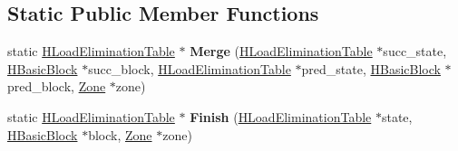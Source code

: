 \subsection*{Static Public Member Functions}
\begin{DoxyCompactItemize}
\item 
static \hyperlink{classv8_1_1internal_1_1_h_load_elimination_table}{H\+Load\+Elimination\+Table} $\ast$ {\bfseries Merge} (\hyperlink{classv8_1_1internal_1_1_h_load_elimination_table}{H\+Load\+Elimination\+Table} $\ast$succ\+\_\+state, \hyperlink{classv8_1_1internal_1_1_h_basic_block}{H\+Basic\+Block} $\ast$succ\+\_\+block, \hyperlink{classv8_1_1internal_1_1_h_load_elimination_table}{H\+Load\+Elimination\+Table} $\ast$pred\+\_\+state, \hyperlink{classv8_1_1internal_1_1_h_basic_block}{H\+Basic\+Block} $\ast$pred\+\_\+block, \hyperlink{classv8_1_1internal_1_1_zone}{Zone} $\ast$zone)\hypertarget{classv8_1_1internal_1_1_h_load_elimination_table_a9001c21ba1ec2f88eeea97ce30b9e5a1}{}\label{classv8_1_1internal_1_1_h_load_elimination_table_a9001c21ba1ec2f88eeea97ce30b9e5a1}

\item 
static \hyperlink{classv8_1_1internal_1_1_h_load_elimination_table}{H\+Load\+Elimination\+Table} $\ast$ {\bfseries Finish} (\hyperlink{classv8_1_1internal_1_1_h_load_elimination_table}{H\+Load\+Elimination\+Table} $\ast$state, \hyperlink{classv8_1_1internal_1_1_h_basic_block}{H\+Basic\+Block} $\ast$block, \hyperlink{classv8_1_1internal_1_1_zone}{Zone} $\ast$zone)\hypertarget{classv8_1_1internal_1_1_h_load_elimination_table_a36e1240b3cbc2a9828f42e0c1b18fbcf}{}\label{classv8_1_1internal_1_1_h_load_elimination_table_a36e1240b3cbc2a9828f42e0c1b18fbcf}

\end{DoxyCompactItemize}
